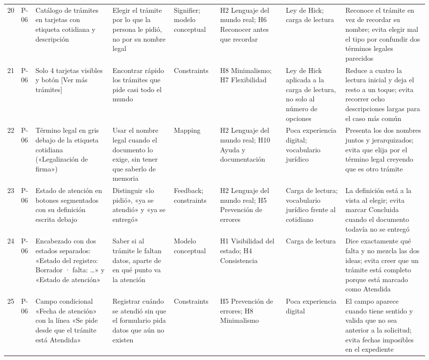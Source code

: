 \begin{longtable}{@{}p{0.6cm}p{1.5cm}p{3.6cm}p{3.4cm}p{2.2cm}p{2.8cm}p{2.3cm}p{4.6cm}@{}}
20 & P-06 & Catálogo de trámites en tarjetas con etiqueta cotidiana y descripción & Elegir el trámite por lo que la persona le pidió, no por su nombre legal & Signifier; modelo conceptual & H2 Lenguaje del mundo real; H6 Reconocer antes que recordar & Ley de Hick; carga de lectura & Reconoce el trámite en vez de recordar su nombre; evita elegir mal el tipo por confundir dos términos legales parecidos \\
21 & P-06 & Solo 4 tarjetas visibles y botón [Ver más trámites] & Encontrar rápido los trámites que pide casi todo el mundo & Constraints & H8 Minimalismo; H7 Flexibilidad & Ley de Hick aplicada a la carga de lectura, no solo al número de opciones & Reduce a cuatro la lectura inicial y deja el resto a un toque; evita recorrer ocho descripciones largas para el caso más común \\
22 & P-06 & Término legal en gris debajo de la etiqueta cotidiana («Legalización de firma») & Usar el nombre legal cuando el documento lo exige, sin tener que saberlo de memoria & Mapping & H2 Lenguaje del mundo real; H10 Ayuda y documentación & Poca experiencia digital; vocabulario jurídico & Presenta los dos nombres juntos y jerarquizados; evita que elija por el término legal creyendo que es otro trámite \\
23 & P-06 & Estado de atención en botones segmentados con su definición escrita debajo & Distinguir «lo pidió», «ya se atendió» y «ya se entregó» & Feedback; constraints & H2 Lenguaje del mundo real; H5 Prevención de errores & Carga de lectura; vocabulario jurídico frente al cotidiano & La definición está a la vista al elegir; evita marcar Concluida cuando el documento todavía no se entregó \\
24 & P-06 & Encabezado con dos estados separados: «Estado del registro: Borrador · falta: …» y «Estado de atención» & Saber si al trámite le faltan datos, aparte de en qué punto va la atención & Modelo conceptual & H1 Visibilidad del estado; H4 Consistencia & Carga de lectura & Dice exactamente qué falta y no mezcla las dos ideas; evita creer que un trámite está completo porque está marcado como Atendida \\
25 & P-06 & Campo condicional «Fecha de atención» con la línea «Se pide desde que el trámite está Atendida» & Registrar cuándo se atendió sin que el formulario pida datos que aún no existen & Constraints & H5 Prevención de errores; H8 Minimalismo & Poca experiencia digital & El campo aparece cuando tiene sentido y valida que no sea anterior a la solicitud; evita fechas imposibles en el expediente \\

\end{longtable}
